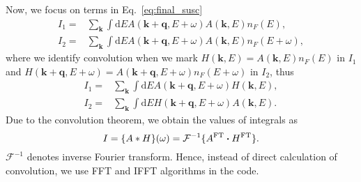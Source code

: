 \documentclass[preprint,prb,amsmath,superscriptaddress,showpacs]{revtex4}
\begin{document}
\newpage

Now, we focus on terms in Eq.~\eqref{eq:final_susc}
%
\begin{align*}
I_1 =& \sum_{\mathbf{k}} \int  \mathrm{d}E A(\mathbf{k} +
       \mathbf{q}, E + \omega) A(\mathbf{k}, E) n_F(E), \\
I_2 =& \sum_{\mathbf{k}} \int  \mathrm{d}E A(\mathbf{k} +
       \mathbf{q}, E + \omega) A(\mathbf{k}, E) n_F(E+\omega),
\end{align*}
%
where we identify convolution when we mark $H(\mathbf{k}, E) =
A(\mathbf{k}, E) n_F(E)$ in $I_1$ and $H(\mathbf{k}+\mathbf{q}, E+\omega) =
A(\mathbf{k} + \mathbf{q}, E + \omega) n_F(E+\omega)$ in $I_2$, thus
%
\begin{align*}
I_1 =& \sum_{\mathbf{k}} \int  \mathrm{d}E A(\mathbf{k} +
       \mathbf{q}, E + \omega) H(\mathbf{k}, E), \\
I_2 =& \sum_{\mathbf{k}} \int  \mathrm{d}E H(\mathbf{k} +
       \mathbf{q}, E + \omega) A(\mathbf{k}, E).
\end{align*}
%
Due to the convolution theorem, we obtain the values of integrals as
%
\begin{equation}
I = \{ A * H \}(\omega) = \mathcal{F}^{-1} \{ A^{\mathrm{FT}}
\dotproduct H^{\mathrm{FT}} \}.
\end{equation}
%
$\mathcal{F}^{-1}$ denotes inverse Fourier transform. Hence, instead of direct
calculation of convolution, we use FFT and IFFT algorithms in the
code.


\end{document}
